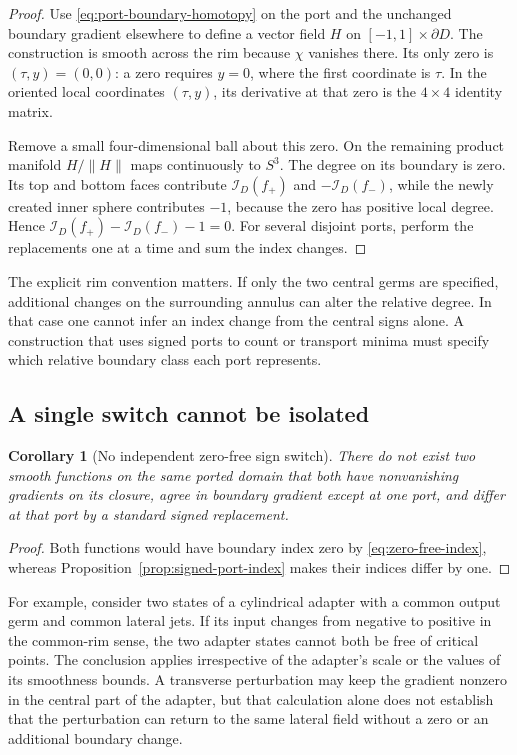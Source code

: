\documentclass[11pt,a4paper]{article}
\newtheorem{corollary}[theorem]{Corollary}
\theoremstyle{definition}
\theoremstyle{remark}
\begin{document}
\begin{proof}
Use \eqref{eq:port-boundary-homotopy} on the port and the unchanged
boundary gradient elsewhere to define a vector field
$H$ on $[-1,1]\times\partial D$.  The construction is smooth across the
rim because $\chi$ vanishes there.  Its only zero is
$(\tau,y)=(0,0)$: a zero requires $y=0$, where the first coordinate is
$\tau$.  In the oriented local coordinates $(\tau,y)$, its derivative
at that zero is the $4\times4$ identity matrix.

Remove a small four-dimensional ball about this zero.  On the remaining
product manifold $H/\|H\|$ maps continuously to $S^3$.  The degree on
its boundary is zero.  Its top and bottom faces contribute
$\mathcal I_D(f_+)$ and $-\mathcal I_D(f_-)$, while the newly created
inner sphere contributes $-1$, because the zero has positive local
degree.  Hence
$\mathcal I_D(f_+)-\mathcal I_D(f_-)-1=0$.
For several disjoint ports, perform the replacements one at a time and
sum the index changes.
\end{proof}

The explicit rim convention matters.  If only the two central germs are
specified, additional changes on the surrounding annulus can alter the
relative degree.  In that case one cannot infer an index change from the
central signs alone.  A construction that uses signed ports to count or
transport minima must specify which relative boundary class each port
represents.

\subsection{A single switch cannot be isolated}

\begin{corollary}[No independent zero-free sign switch]
\label{cor:no-isolated-switch}
There do not exist two smooth functions on the same ported domain that
both have nonvanishing gradients on its closure, agree in boundary
gradient except at one port, and differ at that port by a standard signed
replacement.
\end{corollary}

\begin{proof}
Both functions would have boundary index zero by
\eqref{eq:zero-free-index}, whereas
Proposition~\ref{prop:signed-port-index} makes their indices differ by
one.
\end{proof}

For example, consider two states of a cylindrical adapter with a common
output germ and common lateral jets.  If its input changes from negative
to positive in the common-rim sense, the two adapter states cannot both
be free of critical points.  The conclusion applies irrespective of the
adapter's scale or the values of its smoothness bounds.  A transverse
perturbation may keep the gradient nonzero in the central part of the
adapter, but that calculation alone does not establish that the
perturbation can return to the same lateral field without a zero or an
additional boundary change.
\end{document}
